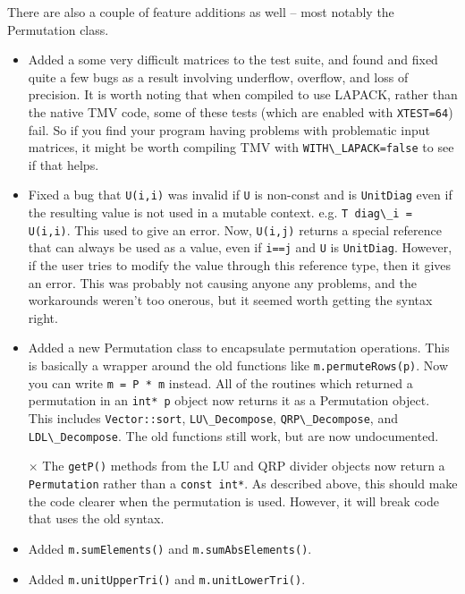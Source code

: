 \documentclass[twoside,letterpaper,11pt]{article}
\renewcommand{\tt}[1]{{\lstinline {#1}}}
\begin{document}
\begin{description}
There are also a couple of feature additions as well -- most notably the Permutation class.

\begin{itemize}

\item Added a some very difficult matrices to the test suite, and found and fixed quite a few 
bugs as a result involving underflow, overflow, and loss of precision.  It is worth noting that
when compiled to use LAPACK, rather than the native TMV code, some of these tests
(which are enabled with \tt{XTEST=64}) fail.  So if you find your program having problems with
problematic input matrices, it might be worth compiling TMV with \tt{WITH\_LAPACK=false} to
see if that helps.

\item Fixed a bug that \tt{U(i,i)} was invalid if \tt{U} is non-const and is \tt{UnitDiag} even 
if the resulting value is not used in a mutable context.  
e.g. \tt{T diag\_i = U(i,i)}.  This used to give an error.  Now, \tt{U(i,j)} returns a special reference
that can always be used as a value, even if \tt{i==j} and \tt{U} is \tt{UnitDiag}.  
However, if the user tries to modify the value through this reference type, then it gives
an error.  This was probably not causing anyone any problems, and the workarounds 
weren't too onerous, but it seemed worth getting the syntax right.

\item Added a new Permutation class to encapsulate permutation operations.  
This is basically a wrapper around the old functions
like \tt{m.permuteRows(p)}.  Now you can write \tt{m = P * m} instead.  All of the routines
which returned a permutation in an \tt{int* p} object now returns it as a Permutation object.
This includes \tt{Vector::sort}, \tt{LU\_Decompose}, \tt{QRP\_Decompose}, and 
\tt{LDL\_Decompose}.  The old functions still work, but are now undocumented.

\item[$\times$] The \tt{getP()} methods from the LU and QRP divider objects now return
a \tt{Permutation} rather than a \tt{const int*}.  As described above, this should make the 
code clearer when the permutation is used.  However, it will break code that uses 
the old syntax.

\item Added \tt{m.sumElements()} and \tt{m.sumAbsElements()}.

\item Added \tt{m.unitUpperTri()} and \tt{m.unitLowerTri()}.


\end{itemize}
\end{description}
\end{document}
